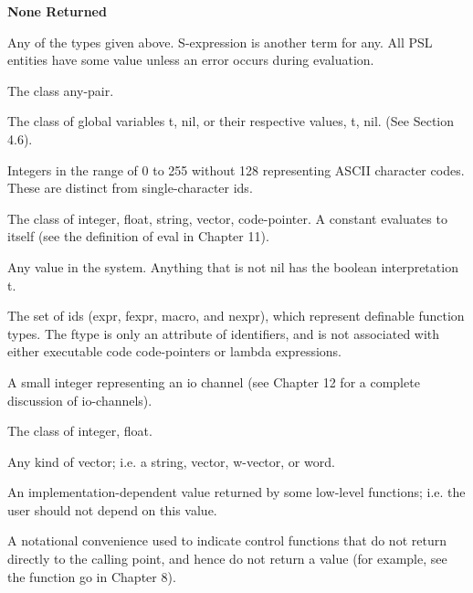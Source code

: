 \begin{Ventry}{\bf None Returned}
\item [{\bf any}]          Any  of  the  types  given  above. S-expression is
              another term for any.  All PSL entities have  some
              value unless an error occurs during evaluation.

\item [{\bf atom }]         The class {any}-{pair}.

\item [{\bf boolean}]       The class of global  variables {t, nil}, or  their
              respective    values,    {t,   nil}.  (See Section
              4.6).

\item [{\bf character}]  Integers in the range of 0 to 255 without 128
		representing ASCII character codes. 
		These are distinct from single-character ids.

\item [{\bf constant}]      The class  of  {integer,  float,  string,  vector,
              code-pointer}.    A  constant  evaluates to itself
              (see the definition of eval in Chapter 11).

\item [{\bf extra-boolean}] Any value  in the  system.    Anything  that    is
              not nil has the boolean interpretation t.

\item [{\bf ftype}]         The  set  of  ids (expr, fexpr, macro, and nexpr),
              which represent definable  function  types.    The
              ftype  is only an attribute of identifiers, and is
              not  associated  with   either   executable   code
              code-pointers or lambda expressions.

\item [{\bf io-channel}]    A  small  integer  representing an io channel (see
              Chapter  12   for   a   complete   discussion   of
              io-channels).

\item [{\bf number}]       The class of {integer, float}.

\item [{\bf x-vector}]      Any   kind  of  vector;  i.e.  a  string,  vector,
              w-vector, or word.

\item [{\bf Undefined}]     An implementation-dependent value returned by some
              low-level functions;  i.e.  the  user  should  not
              depend on this value.

\item [{\bf None Returned}] A  notational convenience used to indicate control
              functions that  do  not  return  directly  to  the
              calling  point,  and  hence  do not return a value
              (for example, see the function go in Chapter 8).
\end{Ventry}

